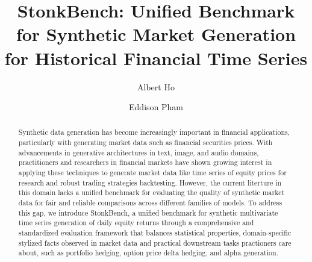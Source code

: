 \documentclass[sigconf]{acmart}
\begin{document}
\title{StonkBench: Unified Benchmark for Synthetic Market Generation for Historical Financial Time Series}



\author{Albert Ho}

\author{Eddison Pham}
\authornotemark[1]



\renewcommand{\shortauthors}{Ho and Pham}

\begin{abstract}
Synthetic data generation has become increasingly important in financial
applications, particularly with generating market data such as
financial securities prices. With advancements in generative
architectures in text, image, and audio domains, practitioners and researchers
in financial markets
have shown growing interest in applying these techniques to generate 
market data like time series of equity prices for 
research and robust trading strategies backtesting. However,
the current literture in this domain lacks a unified benchmark for 
evaluating the quality of synthetic market data for fair and reliable 
comparisons across different families of models. To address this gap, we
introduce StonkBench, a unified benchmark for synthetic multivariate
time series generation of daily equity returns through a comprehensive and 
standardized evaluation framework that balances statistical properties, 
domain-specific stylized facts observed in market data and 
practical downstream tasks practioners care about, 
such as portfolio hedging, option price delta hedging, and alpha generation.
\end{abstract}


\end{document}
